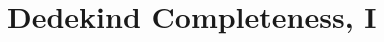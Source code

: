 \documentclass[main.tex]{subfiles}
\begin{document}
\section{Dedekind Completeness, I}


\clearpage
\end{document}
